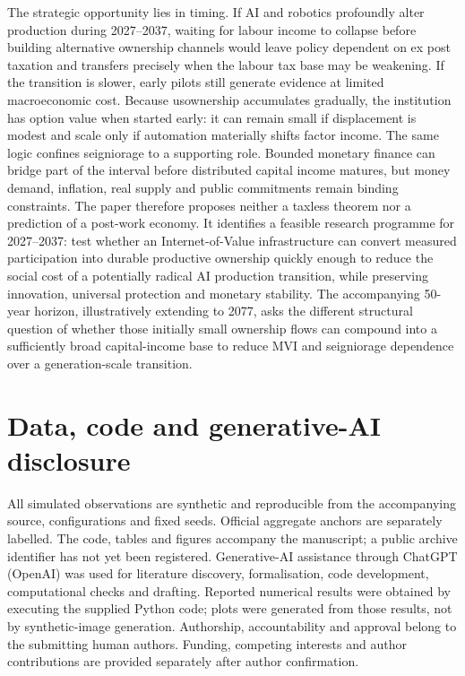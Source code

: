 The strategic opportunity lies in timing. If AI and robotics profoundly alter production during 2027--2037, waiting for labour income to collapse before building alternative ownership channels would leave policy dependent on ex post taxation and transfers precisely when the labour tax base may be weakening. If the transition is slower, early pilots still generate evidence at limited macroeconomic cost. Because usownership accumulates gradually, the institution has option value when started early: it can remain small if displacement is modest and scale only if automation materially shifts factor income. The same logic confines seigniorage to a supporting role. Bounded monetary finance can bridge part of the interval before distributed capital income matures, but money demand, inflation, real supply and public commitments remain binding constraints. The paper therefore proposes neither a taxless theorem nor a prediction of a post-work economy. It identifies a feasible research programme for 2027--2037: test whether an Internet-of-Value infrastructure can convert measured participation into durable productive ownership quickly enough to reduce the social cost of a potentially radical AI production transition, while preserving innovation, universal protection and monetary stability. The accompanying 50-year horizon, illustratively extending to 2077, asks the different structural question of whether those initially small ownership flows can compound into a sufficiently broad capital-income base to reduce MVI and seigniorage dependence over a generation-scale transition.

\section*{Data, code and generative-AI disclosure}
All simulated observations are synthetic and reproducible from the accompanying source, configurations and fixed seeds. Official aggregate anchors are separately labelled. The code, tables and figures accompany the manuscript; a public archive identifier has not yet been registered. Generative-AI assistance through ChatGPT (OpenAI) was used for literature discovery, formalisation, code development, computational checks and drafting. Reported numerical results were obtained by executing the supplied Python code; plots were generated from those results, not by synthetic-image generation. Authorship, accountability and approval belong to the submitting human authors. Funding, competing interests and author contributions are provided separately after author confirmation.
